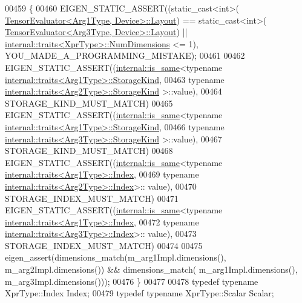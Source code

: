 \begin{DoxyCode}
00459   \{
00460     EIGEN\_STATIC\_ASSERT((static\_cast<int>(
      \hyperlink{struct_eigen_1_1_tensor_evaluator}{TensorEvaluator<Arg1Type, Device>::Layout}) == static\_cast<int>(
      \hyperlink{struct_eigen_1_1_tensor_evaluator}{TensorEvaluator<Arg3Type, Device>::Layout}) || 
      \hyperlink{struct_eigen_1_1internal_1_1traits}{internal::traits<XprType>::NumDimensions} <= 1), 
      YOU\_MADE\_A\_PROGRAMMING\_MISTAKE);
00461 
00462     EIGEN\_STATIC\_ASSERT((\hyperlink{struct_eigen_1_1internal_1_1is__same}{internal::is\_same}<\textcolor{keyword}{typename} 
      \hyperlink{struct_eigen_1_1internal_1_1traits}{internal::traits<Arg1Type>::StorageKind},
00463                          \textcolor{keyword}{typename} \hyperlink{struct_eigen_1_1internal_1_1traits}{internal::traits<Arg2Type>::StorageKind}
      >::value),
00464                         STORAGE\_KIND\_MUST\_MATCH)
00465     EIGEN\_STATIC\_ASSERT((\hyperlink{struct_eigen_1_1internal_1_1is__same}{internal::is\_same}<\textcolor{keyword}{typename} 
      \hyperlink{struct_eigen_1_1internal_1_1traits}{internal::traits<Arg1Type>::StorageKind},
00466                          \textcolor{keyword}{typename} \hyperlink{struct_eigen_1_1internal_1_1traits}{internal::traits<Arg3Type>::StorageKind}
      >::value),
00467                         STORAGE\_KIND\_MUST\_MATCH)
00468     EIGEN\_STATIC\_ASSERT((\hyperlink{struct_eigen_1_1internal_1_1is__same}{internal::is\_same}<\textcolor{keyword}{typename} 
      \hyperlink{struct_eigen_1_1internal_1_1traits}{internal::traits<Arg1Type>::Index},
00469                          \textcolor{keyword}{typename} \hyperlink{struct_eigen_1_1internal_1_1traits}{internal::traits<Arg2Type>::Index}>::
      value),
00470                         STORAGE\_INDEX\_MUST\_MATCH)
00471     EIGEN\_STATIC\_ASSERT((\hyperlink{struct_eigen_1_1internal_1_1is__same}{internal::is\_same}<\textcolor{keyword}{typename} 
      \hyperlink{struct_eigen_1_1internal_1_1traits}{internal::traits<Arg1Type>::Index},
00472                          \textcolor{keyword}{typename} \hyperlink{struct_eigen_1_1internal_1_1traits}{internal::traits<Arg3Type>::Index}>::
      value),
00473                         STORAGE\_INDEX\_MUST\_MATCH)
00474 
00475     eigen\_assert(dimensions\_match(m\_arg1Impl.dimensions(), m\_arg2Impl.dimensions()) && dimensions\_match(
      m\_arg1Impl.dimensions(), m\_arg3Impl.dimensions()));
00476   \}
00477 
00478   \textcolor{keyword}{typedef} \textcolor{keyword}{typename} XprType::Index Index;
00479   \textcolor{keyword}{typedef} \textcolor{keyword}{typename} XprType::Scalar Scalar;

\end{DoxyCode}
